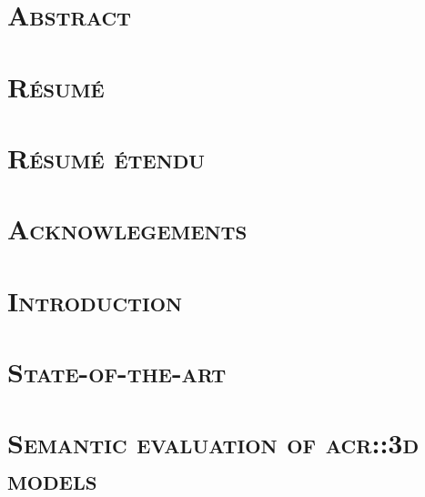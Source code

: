 \documentclass[12pt, twoside]{book}
\begin{document}
    \dominitoc
    \doparttoc
    \frontmatter
    \pagestyle{plain}
   
    
    
    \leftchapter
    \chapter{\textsc{Abstract}}
        
    \chapter{\textsc{Résumé}}
        
    \chapter{\textsc{Résumé étendu}}
        
    \chapter{\textsc{Acknowlegements}}
        

    \printglossary[type=\acronymtype]
    \printglossary

    \mtcaddchapter
    \tableofcontents
    \mtcaddchapter
    \listoffigures
    \mtcaddchapter
    \listoftables
    \mtcaddchapter

    \mainmatter
    \rightchapter

    \chapter{\textsc{Introduction}}
        \label{chap::introduction}
        
   
    \chapter{\textsc{State-of-the-art}}
        \label{chap::state_of_the_art}
        

    \chapter{\textsc{Semantic evaluation of \texorpdfstring{\gls*{acr::3d}}{3D} models}}
        \label{chap::semantic_evaluation}
        
\end{document}
